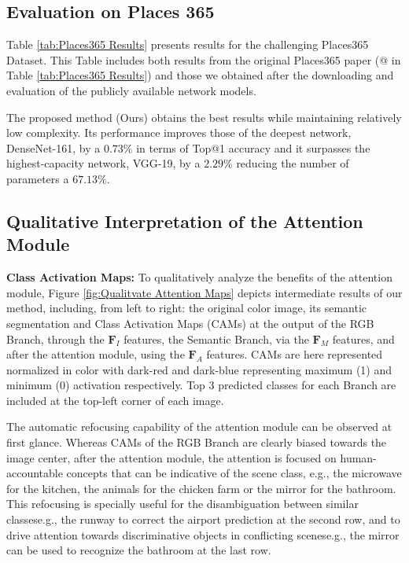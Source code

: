 \documentclass[review, 3p, sort&compress]{elsarticle}
\begin{document}
\subsection*{Evaluation on Places 365}
Table \ref{tab:Places365 Results} presents results for the challenging Places365 Dataset. This Table includes both results from the original Places365 paper (@\cite{zhou2018places} in Table \ref{tab:Places365 Results}) and those we obtained after the downloading and evaluation of the publicly available network models. 

The proposed method (Ours) obtains the best results while maintaining relatively low complexity. Its performance improves those of the deepest network, DenseNet-161, by a \(0.73 \%\) in terms of Top@1 accuracy and it surpasses the highest-capacity network, VGG-19, by a \(2.29 \%\) reducing the number of parameters a \(67.13 \%\).

\subsection{Qualitative Interpretation of the Attention Module}
\textbf{Class Activation Maps:}
To qualitatively analyze the benefits of the attention module, Figure \ref{fig:Qualitvate Attention Maps} depicts intermediate results of our method, including, from left to right: the original color image, its semantic segmentation and Class Activation Maps (CAMs) \cite{zhou2015cnnlocalization} at the output of the RGB Branch, through the \(\textbf{F}_I\) features, the Semantic Branch, via the \(\textbf{F}_M\) features, and after the attention module, using the \(\textbf{F}_A\) features. CAMs are here represented normalized in color with dark-red and dark-blue representing maximum (1) and minimum (0) activation respectively. Top 3 predicted classes for each Branch are included at the top-left corner of each image.

The automatic refocusing capability of the attention module can be observed at first glance. Whereas CAMs of the RGB Branch are clearly biased towards the image center, after the attention module, the attention is focused on human-accountable concepts that can be indicative of the scene class, e.g., the microwave for the kitchen, the animals for the chicken farm or the mirror for the bathroom. This refocusing is specially useful for the disambiguation between similar classes\textemdash e.g., the runway to correct the airport prediction at the second row, and to drive attention towards discriminative objects in conflicting scenes\textemdash e.g., the mirror can be used to recognize the bathroom at the last row.
\end{document}
